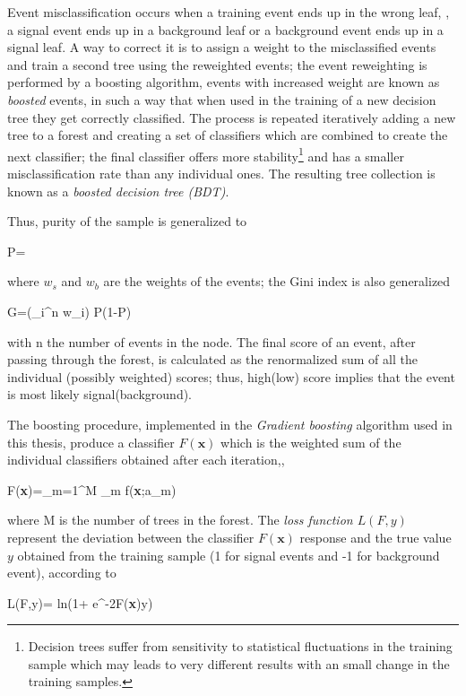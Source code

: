 Event misclassification occurs when a training event ends up in the wrong leaf, \ie, a signal event ends up in a background leaf or a background event ends up in a signal leaf. A way to correct it is to assign a weight to the misclassified events and train a second tree using the reweighted events; the event reweighting is performed by a boosting algorithm, events with increased weight are known as \textit{boosted} events, in such a way that when used in the training of a new decision tree they get correctly classified. The process is repeated iteratively adding a new tree to a forest and creating a set of classifiers which are combined to create the next classifier; the final classifier offers more stability\footnote{Decision trees suffer from sensitivity to statistical fluctuations in the training sample which may leads to very different results with an small change in the training samples.} and has a smaller misclassification rate than any individual ones. The resulting tree collection is known as a \textit{boosted decision tree (BDT)}.

Thus, purity of the sample is generalized to 

\beqn
P=
\eeqn

\noindent where $w_s$ and $w_b$ are the weights of the events; the Gini index is also generalized

\beqn
G=\left(\sum_i^n w_i\right) P(1-P)
\eeqn

\noindent with n the number of events in the node. The final score of an event, after passing through the forest, is calculated as the renormalized sum of all the individual (possibly weighted) scores; thus, high(low) score implies that the event is most likely signal(background).   

The boosting procedure, implemented in the  \textit{Gradient boosting} algorithm used in this thesis, produce a classifier $F(\textbf{x})$ which is the weighted sum of the individual classifiers obtained after each iteration,\ie,   

\beqn
F(\textbf{x})=\sum_{m=1}^M \beta_m f(\textbf{x};a_m)
\eeqn

\noindent where M is the number of trees in the forest. The \textit{loss function $L(F,y)$} represent the deviation between the classifier $F(\textbf{x})$ response and the true value $y$ obtained from the training sample (1 for signal events and -1 for background event), according to 

\beqn
L(F,y)= \textrm{ln}(1+ e^{-2F(\textbf{x})y})
\eeqn

